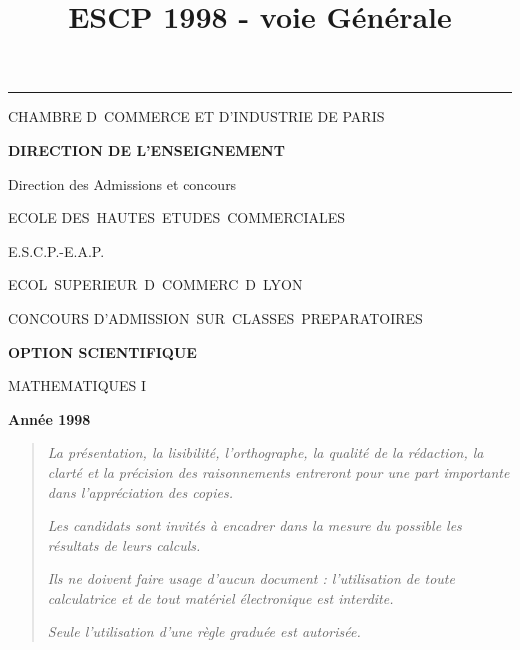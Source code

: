 \documentclass[11pt]{article}%
\title{\bf \vspace{-2cm} ESCP 1998 - voie Générale} %
\author{} %
\date{} %
\begin{document}
\maketitle %
\vspace{-1.4cm}\hrule %
\thispagestyle{fancy}

\vspace*{.2cm}




\begin{center}
{\small CHAMBRE D\E\ COMMERCE ET D'INDUSTRIE DE PARIS}

\textbf{DIRECTION DE L'ENSEIGNEMENT}

Direction des Admissions et concours

\underline{\hspace*{3cm}}

{\Large ECOLE DES\ HAUTES\ ETUDES\ COMMERCIALES}

{\Large E.S.C.P.-E.A.P.}

{\Large ECOL\E\ SUPERIEUR\E\ D\E\ COMMERC\E\ D\E\ LYON}{\large }

CONCOURS D'ADMISSION\ SUR\ CLASSES\ PREPARATOIRES

\underline{\hspace*{3cm}}

\textbf{OPTION SCIENTIFIQUE}

{\Large MATHEMATIQUES I}

\textbf{Année 1998}

\underline{\hspace*{3cm}}
\end{center}

\begin{quotation}
\noindent \textsl{La présentation, la lisibilité, l'orthographe, la
qualité
de la rédaction, la clarté et la précision des raisonnements entreront
pour
une part importante dans l'appréciation des copies.}

\noindent \textsl{Les candidats sont invités à encadrer dans la mesure
du
possible les résultats de leurs calculs.}

\noindent \textsl{Ils ne doivent faire usage d'aucun document :
l'utilisation de toute calculatrice et de tout matériel électronique
est
interdite.}

\noindent \textsl{Seule l'utilisation d'une règle graduée est
autorisée.}

\noindent \textsl{\hrulefill }
\end{quotation}
\end{document}

